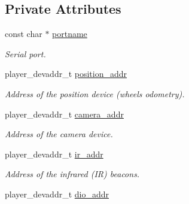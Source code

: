 \subsection*{Private Attributes}
\begin{CompactItemize}
\item 
\hypertarget{classSurveyor_38749a6bd74747baebfe451c31a421a2}{
const char $\ast$ \hyperlink{classSurveyor_38749a6bd74747baebfe451c31a421a2}{portname}}
\label{classSurveyor_38749a6bd74747baebfe451c31a421a2}

\begin{CompactList}\small\item\em Serial port. \item\end{CompactList}\item 
\hypertarget{classSurveyor_0461b15e1ccc6ad41ba2b35c5c0a9fd9}{
player\_\-devaddr\_\-t \hyperlink{classSurveyor_0461b15e1ccc6ad41ba2b35c5c0a9fd9}{position\_\-addr}}
\label{classSurveyor_0461b15e1ccc6ad41ba2b35c5c0a9fd9}

\begin{CompactList}\small\item\em Address of the position device (wheels odometry). \item\end{CompactList}\item 
\hypertarget{classSurveyor_918eb3eda100f7d55a60f2a747f0c8ab}{
player\_\-devaddr\_\-t \hyperlink{classSurveyor_918eb3eda100f7d55a60f2a747f0c8ab}{camera\_\-addr}}
\label{classSurveyor_918eb3eda100f7d55a60f2a747f0c8ab}

\begin{CompactList}\small\item\em Address of the camera device. \item\end{CompactList}\item 
\hypertarget{classSurveyor_1bfadaaaab919f00e8cd57ee287cfac8}{
player\_\-devaddr\_\-t \hyperlink{classSurveyor_1bfadaaaab919f00e8cd57ee287cfac8}{ir\_\-addr}}
\label{classSurveyor_1bfadaaaab919f00e8cd57ee287cfac8}

\begin{CompactList}\small\item\em Address of the infrared (IR) beacons. \item\end{CompactList}\item 
\hypertarget{classSurveyor_176ae803c97cadfc05b2cf88187b4ed2}{
player\_\-devaddr\_\-t \hyperlink{classSurveyor_176ae803c97cadfc05b2cf88187b4ed2}{dio\_\-addr}}
\label{classSurveyor_176ae803c97cadfc05b2cf88187b4ed2}


\end{CompactItemize}

